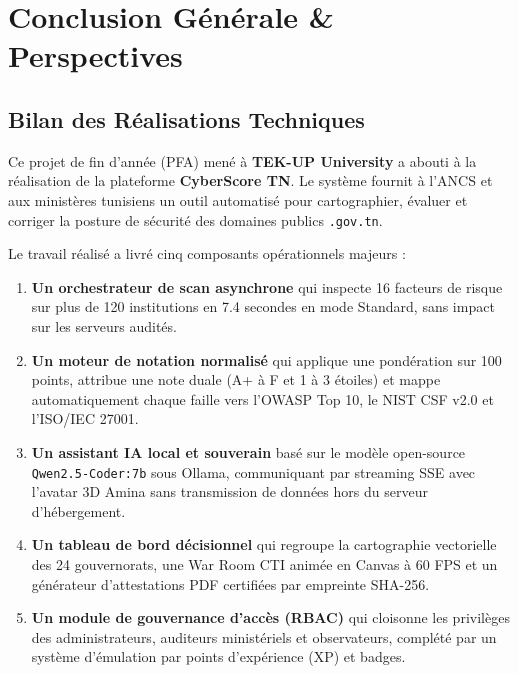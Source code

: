 \chapter[Conclusion \& Perspectives]{Conclusion Générale \& Perspectives}
\label{chap:conclusion}

\section{Bilan des Réalisations Techniques}
Ce projet de fin d'année (PFA) mené à \textbf{TEK-UP University} a abouti à la réalisation de la plateforme \textbf{CyberScore TN}. Le système fournit à l'ANCS et aux ministères tunisiens un outil automatisé pour cartographier, évaluer et corriger la posture de sécurité des domaines publics \texttt{.gov.tn}.

Le travail réalisé a livré cinq composants opérationnels majeurs :
\begin{enumerate}
    \item \textbf{Un orchestrateur de scan asynchrone} qui inspecte 16 facteurs de risque sur plus de 120 institutions en 7.4 secondes en mode Standard, sans impact sur les serveurs audités.
    \item \textbf{Un moteur de notation normalisé} qui applique une pondération sur 100 points, attribue une note duale (A+ à F et 1 à 3 étoiles) et mappe automatiquement chaque faille vers l'OWASP Top 10, le NIST CSF v2.0 et l'ISO/IEC 27001.
    \item \textbf{Un assistant IA local et souverain} basé sur le modèle open-source \texttt{Qwen2.5-Coder:7b} sous Ollama, communiquant par streaming SSE avec l'avatar 3D Amina sans transmission de données hors du serveur d'hébergement.
    \item \textbf{Un tableau de bord décisionnel} qui regroupe la cartographie vectorielle des 24 gouvernorats, une War Room CTI animée en Canvas à 60 FPS et un générateur d'attestations PDF certifiées par empreinte SHA-256.
    \item \textbf{Un module de gouvernance d'accès (RBAC)} qui cloisonne les privilèges des administrateurs, auditeurs ministériels et observateurs, complété par un système d'émulation par points d'expérience (XP) et badges.
\end{enumerate}

